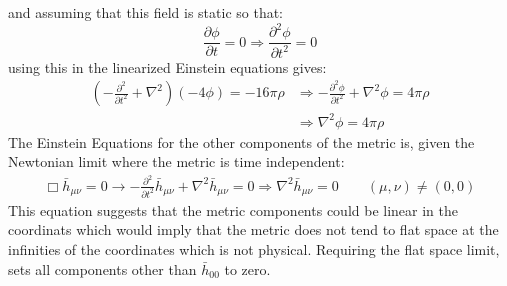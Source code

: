 \documentclass[12pt,a4]{article}
\begin{document}
\begin{enumerate}
\begin{enumerate}
        and assuming that this field is static so that:
        \begin{equation*}
          \frac{\partial \phi}{\partial t} = 0 \Rightarrow \frac{\partial^2 \phi}{\partial t^2} = 0
        \end{equation*}
        using this in the linearized Einstein equations gives:
        \begin{align*}
          \left(- \frac{\partial^2 }{\partial t^2} + \nabla^2\right) (- 4 \phi) = -16 \pi \rho  &\Rightarrow - \frac{\partial^2 \phi}{\partial t^2} + \nabla^2 \phi = 4 \pi \rho \\
                                                                                                &\Rightarrow \nabla^2 \phi = 4 \pi \rho
        \end{align*}
        The Einstein Equations for the other components of the metric is, given the Newtonian limit where the metric is time independent:
        \begin{align*}
          \Box \bar{h}_{\mu\nu} = 0 \rightarrow - \frac{\partial^2}{\partial t^2} \bar{h}_{\mu\nu} +\nabla^2 \bar{h}_{\mu\nu} = 0 \Rightarrow \nabla^2 \bar{h}_{\mu\nu} = 0 \qquad (\mu,\nu) \neq (0, 0)
        \end{align*}
        This equation suggests that the metric components could be linear in the coordinats which would imply that the metric does not tend to flat space at the infinities of the coordinates which is not physical.
        Requiring the flat space limit, sets all components other than $\bar{h}_{00}$ to zero.


\end{enumerate}
\end{enumerate}
\end{document}
